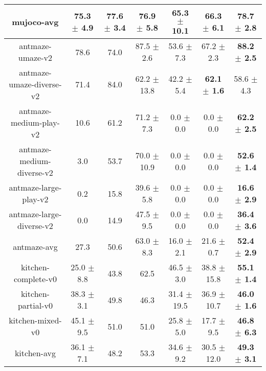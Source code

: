 \begin{table*}[t]
{\begin{tabular}{cccc|ccc}
mujoco-avg                      & 75.3 $\pm$ 4.9  & 77.6 $\pm$ 3.4                        & 76.9 $\pm$ 5.8   & 65.3 $\pm$ 10.1  &   66.3 $\pm$ 6.1                   & \textbf{78.7 $\pm$ 2.8}     \\ 
\midrule
antmaze-umaze-v2             & 78.6            & 74.0                                  & 87.5 $\pm$ 2.6   & 53.6 $\pm$ 7.3  & 67.2 $\pm$ 2.3       & \textbf{88.2 $\pm$ 2.5}     \\
antmaze-umaze-diverse-v2     & 71.4            & 84.0                                  & 62.2 $\pm$ 13.8  & 42.2 $\pm$ 5.4  & \textbf{62.1 $\pm$ 1.6}       & 58.6 $\pm$ 4.3     \\
antmaze-medium-play-v2       & 10.6            & 61.2                                  & 71.2 $\pm$ 7.3   & 0.0 $\pm$ 0.0   & 0.0 $\pm$ 0.0        & \textbf{62.2 $\pm$ 2.5}     \\
antmaze-medium-diverse-v2    & 3.0             & 53.7                                  & 70.0 $\pm$ 10.9  & 0.0 $\pm$ 0.0   & 0.0 $\pm$ 0.0        & \textbf{52.6 $\pm$ 1.4}     \\
antmaze-large-play-v2        & 0.2             & 15.8                                  & 39.6 $\pm$ 5.8   & 0.0 $\pm$ 0.0   & 0.0 $\pm$ 0.0        & \textbf{16.6 $\pm$ 2.9}      \\
antmaze-large-diverse-v2     & 0.0             & 14.9                                  & 47.5 $\pm$ 9.5   & 0.0 $\pm$ 0.0   & 0.0 $\pm$ 0.0        & \textbf{36.4 $\pm$ 3.6}   \\ \hline
antmaze-avg                  & 27.3            & 50.6                                  & 63.0 $\pm$ 8.3   & 16.0 $\pm$ 2.1  & 21.6 $\pm$ 0.7       & \textbf{52.4 $\pm$ 2.9}     \\ 
\midrule
kitchen-complete-v0          & 25.0 $\pm$ 8.8               & 43.8                                  & 62.5             & 46.5 $\pm$ 3.0  &       38.8 $\pm$ 15.8               &   \textbf{55.1 $\pm$ 1.4}                   \\
kitchen-partial-v0           & 38.3 $\pm$ 3.1               & 49.8                                  & 46.3             & 31.4 $\pm$ 19.5 &       36.9 $\pm$ 10.7               &      \textbf{46.0 $\pm$ 1.6}              \\
kitchen-mixed-v0             & 45.1 $\pm$ 9.5               & 51.0                                  & 51.0             & 25.8 $\pm$ 5.0  &       17.7 $\pm$ 9.5               &   \textbf{46.8 $\pm$ 6.3}                 \\ \hline
kitchen-avg                  & 36.1 $\pm$ 7.1               & 48.2                                  & 53.3             & 34.6 $\pm$ 9.2  &       30.5 $\pm$ 12.0               &       \textbf{49.3 $\pm$ 3.1}            \\ \hline

\end{tabular}}
\end{table*}
